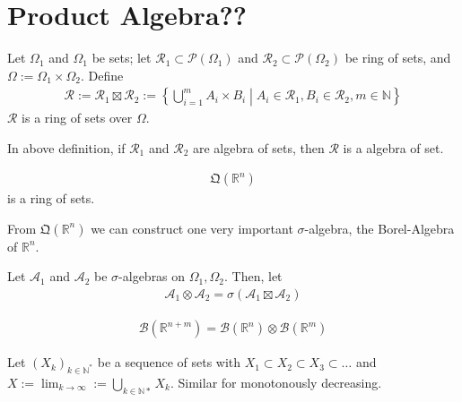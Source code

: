 \section{Product Algebra??}
\begin{definition}
    Let \(\Omega_1\) and \(\Omega_1\) be sets; let \(\mathcal{R}_1 \subset \mathcal{P}(\Omega_1)\) and \(\mathcal{R}_2 \subset \mathcal{P}(\Omega_2)\) be ring of sets, and \(\Omega := \Omega_1 \times \Omega_2\). Define
    \begin{align}
        \mathcal{R} := \mathcal{R}_1 \boxtimes \mathcal{R}_2 := \left\{ \bigcup_{i=1}^m A_i \times B_i \middle| A_i \in \mathcal{R}_1, B_i \in \mathcal{R}_2, m \in \mathbb{N} \right\}
    \end{align}
    \(\mathcal{R}\) is a ring of sets over \(\Omega\).
\end{definition}
\begin{theorem}
    In above definition, if \(\mathcal{R}_1\) and \(\mathcal{R}_2\) are algebra of sets, then \(\mathcal{R}\) is a algebra of set.
\end{theorem}
\begin{theorem}
    \begin{align}
        \mathfrak{Q}(\mathbb{R}^n)
    \end{align}
    is a ring of sets.
\end{theorem}
\begin{remark}
    From \(\mathfrak{Q}(\mathbb{R}^n)\) we can construct one very important \(\sigma\)-algebra, the Borel-Algebra of \(\mathbb{R}^n\).
\end{remark}
\begin{definition}
    Let \(\mathcal{A}_1\) and \(\mathcal{A}_2\) be \(\sigma\)-algebras on \(\Omega_1, \Omega_2\). Then, let
    \begin{align}
        \mathcal{A}_1 \otimes \mathcal{A}_2 = \sigma( \mathcal{A}_1 \boxtimes \mathcal{A}_2 )
    \end{align}
\end{definition}
\begin{example}
    \begin{align}
        \mathcal{B}(\mathbb{R}^{n+m}) = \mathcal{B}(\mathbb{R}^n) \otimes \mathcal{B}(\mathbb{R}^m)
    \end{align}
\end{example}
\begin{definition}
    Let \((X_k)_{k \in \mathbb{N}^*}\) be a sequence of sets with \(X_1 \subset X_2 \subset X_3 \subset \dots \) and \(X := \lim_{k \rightarrow \infty} := \bigcup_{k \in \mathbb{N}*} X_k\).
    Similar for monotonously decreasing.
\end{definition}

